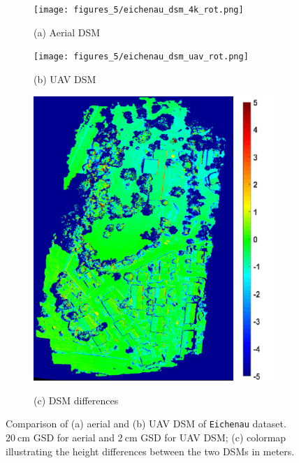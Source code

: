 \begin{figure}[bph]
    \centering
       \begin{subfigure}[b]{0.3\columnwidth}
           \centering
           \texttt{[image: figures\_5/eichenau\_dsm\_4k\_rot.png]}
           {{\small }}    
           \centerline{\small{(a) Aerial DSM}}\medskip
       \end{subfigure}
       \hfill
       \begin{subfigure}[b]{0.3\columnwidth}  
           \centering 
           \texttt{[image: figures\_5/eichenau\_dsm\_uav\_rot.png]}         
           {{\small }}    
           \centerline{\small{(b) UAV DSM}}\medskip
       \end{subfigure}
       \hfill
       \begin{subfigure}[b]{0.35\columnwidth}
           \centering
           \includegraphics[width=\textwidth]{figures_5/eichenau_dsm_dif_rot.png}
           {{\small }}    
           \centerline{\small{(c) DSM differences}}\medskip
       \end{subfigure}
       \caption{Comparison of (a) aerial and (b) UAV DSM of \texttt{Eichenau} dataset. $\SI{20}{\cm}$ GSD for aerial and $\SI{2}{\cm}$ GSD for UAV DSM; (c) colormap illustrating the height differences between the two DSMs in meters.}
       \label{fig:dsm_eichenau}
\end{figure}

